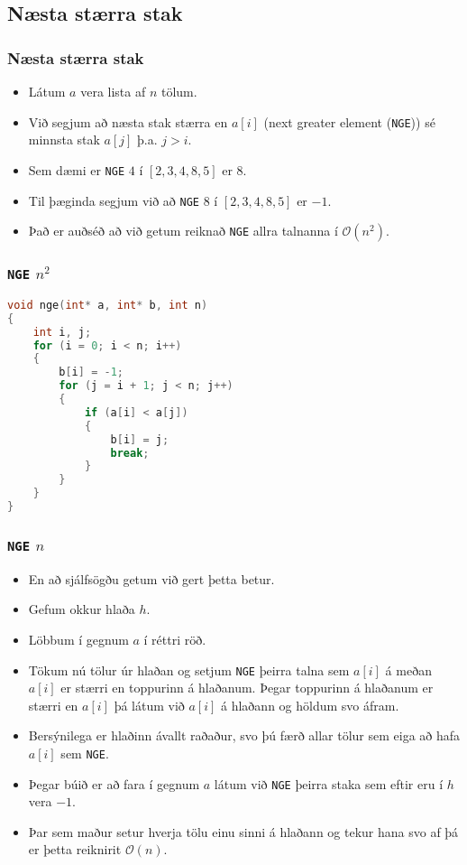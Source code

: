 \documentclass{beamer}
\begin{document}
\subsection{Næsta stærra stak}

\begin{frame}
	\frametitle{Næsta stærra stak}
	\begin{itemize}
		\item<1-> Látum $a$ vera lista af $n$ tölum.
		\item<2-> Við segjum að næsta stak stærra en $a[i]$
			(next greater element (\texttt{NGE})) sé minnsta stak $a[j]$ þ.a. $j > i$.
		\item<3-> Sem dæmi er \texttt{NGE} $4$ í $[2, 3, 4, 8, 5]$ er $8$.
		\item<4-> Til þæginda segjum við að
			\texttt{NGE} $8$ í $[2, 3, 4, 8, 5]$ er $-1$.
		\item<5-> Það er auðséð að við getum reiknað \texttt{NGE} allra talnanna í
			$\mathcal{O}(n^2)$.
	\end{itemize}
\end{frame}

\begin{frame}[fragile]
	\frametitle{\texttt{NGE} $n^2$}
	\tiny
	\begin{lstlisting}[language=C]
void nge(int* a, int* b, int n)
{
	int i, j;
	for (i = 0; i < n; i++)
	{
		b[i] = -1;
		for (j = i + 1; j < n; j++)
		{
			if (a[i] < a[j])
			{
				b[i] = j;
				break;
			}
		}
	}
}
	\end{lstlisting}
\end{frame}

\begin{frame}
	\frametitle{\texttt{NGE} $n$}
	\begin{itemize}
		\item<1-> En að sjálfsögðu getum við gert þetta betur.
		\item<2-> Gefum okkur hlaða $h$. 
		\item<3-> Löbbum í gegnum $a$ í réttri röð.
		\item<4-> Tökum nú tölur úr hlaðan og setjum \texttt{NGE} þeirra talna
			sem $a[i]$ á meðan $a[i]$ er stærri en toppurinn á hlaðanum. Þegar toppurinn
			á hlaðanum er stærri en $a[i]$ þá látum við $a[i]$ á hlaðann og höldum svo áfram.
		\item<5-> Bersýnilega er hlaðinn ávallt raðaður, svo þú færð allar tölur
			sem eiga að hafa $a[i]$ sem \texttt{NGE}.
		\item<6-> Þegar búið er að fara í gegnum $a$ látum við \texttt{NGE} þeirra staka sem
			eftir eru í $h$ vera $-1$.
		\item<7-> Þar sem maður setur hverja tölu einu sinni á hlaðann og tekur hana svo
			af þá er þetta reiknirit $\mathcal{O}(n)$.
	\end{itemize}
\end{frame}
\end{document}

